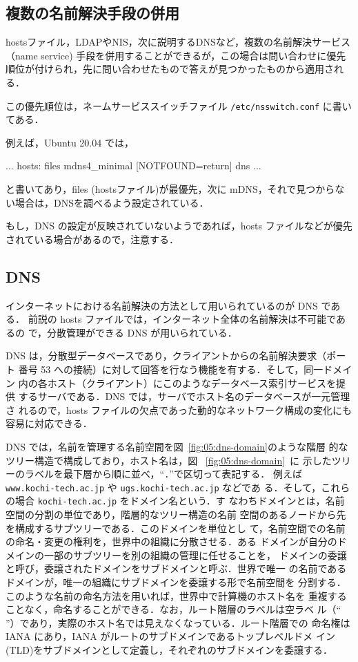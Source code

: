 \subsection*{複数の名前解決手段の併用}

hostsファイル，LDAPやNIS，次に説明するDNSなど，複数の名前解決サービス（name service) 手段を併用することができるが，この場合は問い合わせに優先順位が付けられ，先に問い合わせたもので答えが見つかったものから適用される．

この優先順位は，ネームサービススイッチファイル \texttt{/etc/nsswitch.conf}  に書いてある．

例えば，Ubuntu 20.04 では，
\begin{cli}
...
hosts:          files mdns4_minimal [NOTFOUND=return] dns
...
\end{cli}
と書いてあり，files (hostsファイル)が最優先，次に mDNS，それで見つからない場合は，DNSを調べるよう設定されている．

もし，DNS の設定が反映されていないようであれば，hosts ファイルなどが優先されている場合があるので，注意する．

\subsection*{DNS}
インターネットにおける名前解決の方法として用いられているのが DNS である．
前説の hosts ファイルでは，インターネット全体の名前解決は不可能であるの
で，分散管理ができる DNS が用いられている．

DNS は，分散型データベースであり，クライアントからの名前解決要求（ポート
番号 53 への接続）に対して回答を行なう機能を有する．そして，同一ドメイン
内の各ホスト（クライアント）にこのようなデータベース索引サービスを提供
するサーバである．DNS では，サーバでホスト名のデータベースが一元管理さ
れるので，hosts ファイルの欠点であった動的なネットワーク構成の変化にも
容易に対応できる．

DNS では，名前を管理する名前空間を図~\ref{fig:05:dns-domain}のような階層
的なツリー構造で構成しており，ホスト名は，図~ \ref{fig:05:dns-domain}~に
示したツリーのラベルを最下層から順に並べ，``\verb|.|''で区切って表記する．
例えば \verb|www.kochi-tech.ac.jp| や \verb|ugs.kochi-tech.ac.jp| などであ
る．そして，これらの場合 \verb|kochi-tech.ac.jp| をドメイン名という．す
なわちドメインとは，名前空間の分割の単位であり，階層的なツリー構造の名前
空間のあるノードから先を構成するサブツリーである．このドメインを単位とし
て，名前空間での名前の命名・変更の権利を，世界中の組織に分散させる．ある
ドメインが自分のドメインの一部のサブツリーを別の組織の管理に任せることを，
ドメインの委譲と呼び，委譲されたドメインをサブドメインと呼ぶ．世界で唯一
の名前であるドメインが，唯一の組織にサブドメインを委譲する形で名前空間を
分割する．このような名前の命名方法を用いれば，世界中で計算機のホスト名を
重複することなく，命名することができる．なお，ルート階層のラベルは空ラベ
ル（`` ''）であり，実際のホスト名では見えなくなっている．ルート階層での
命名権は IANA にあり，IANA がルートのサブドメインであるトップレベルドメ
イン(TLD)をサブドメインとして定義し，それぞれのサブドメインを委譲する．
   
